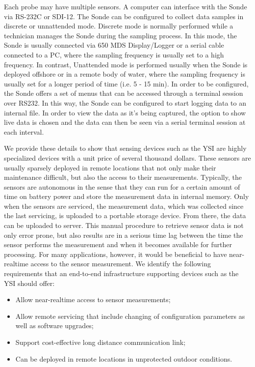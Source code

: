 \documentclass[conference]{IEEEtran}
\begin{document}
Each probe may have multiple sensors.  A computer can interface with
the Sonde via RS-232C or SDI-12. The Sonde can be configured to
collect data samples in discrete or unnattended mode.  Discrete mode
is normally performed while a technician manages the Sonde during the
sampling process. In this mode, the Sonde is usually connected via 650
MDS Display/Logger or a serial cable connected to a PC, where the sampling
frequency is usually set to a high frequency. In contrast, Unattended
mode is performed usually when the Sonde is deployed offshore or in a
remote body of water, where the sampling frequency is usually set for a
longer period of time (i.e. 5 - 15 min). In order to be configured,
the Sonde offers a set of menus that can be accessed through a terminal session
over RS232. In this way, the Sonde can be configured to
start logging data to an internal file. In order to view the data as it's
being captured, the option to show live data is chosen and the data can then be 
seen via a serial terminal session at each interval.

We provide these details to show that sensing devices such as the YSI
are highly specialized devices with a unit price of several thousand
dollars. These sensors are usually sparsely deployed in remote
locations that not only make their maintenance difficult, but also
the access to their measurements.  Typically, the sensors are autonomous
in the sense that they can run for a certain amount of time on battery power and
store the measurement data in internal memory. Only when the sensors
are serviced, the measurement data, which was collected since the last
servicing, is uploaded to a portable storage device. From there, the
data can be uploaded to server. This manual procedure to retrieve
sensor data is not only error prone, but also results are in a serious
time lag between the time the sensor performs the measurement and when
it becomes available for further processing. For many applications,
however, it would be beneficial to have near-realtime access to the
sensor measurement. We identify the following requirements that an
end-to-end infrastructure supporting devices such as the YSI should
offer:

\begin{itemize}
\item Allow near-realtime access to sensor measurements;
\item Allow remote servicing that include changing of configuration
  parameters as well as software upgrades;
\item Support cost-effective long distance communication link;
\item Can be deployed in remote locations in unprotected outdoor
  conditions.
\end{itemize}
\end{document}
